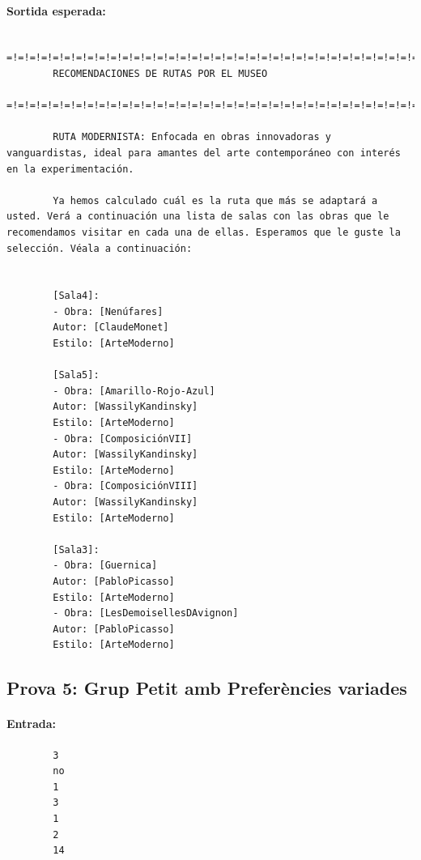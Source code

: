 \documentclass[a4paper]{article}
\begin{document}
	\paragraph{Sortida esperada:}
	\begin{verbatim}
		 =!=!=!=!=!=!=!=!=!=!=!=!=!=!=!=!=!=!=!=!=!=!=!=!=!=!=!=!=!=!=!=!=!=!=!= 
		RECOMENDACIONES DE RUTAS POR EL MUSEO                     
		=!=!=!=!=!=!=!=!=!=!=!=!=!=!=!=!=!=!=!=!=!=!=!=!=!=!=!=!=!=!=!=!=!=!=!= 
		
		RUTA MODERNISTA: Enfocada en obras innovadoras y vanguardistas, ideal para amantes del arte contemporáneo con interés en la experimentación.
		
		Ya hemos calculado cuál es la ruta que más se adaptará a usted. Verá a continuación una lista de salas con las obras que le recomendamos visitar en cada una de ellas. Esperamos que le guste la selección. Véala a continuación:
		
		
		[Sala4]:
		- Obra: [Nenúfares]
		Autor: [ClaudeMonet]
		Estilo: [ArteModerno]
		
		[Sala5]:
		- Obra: [Amarillo-Rojo-Azul]
		Autor: [WassilyKandinsky]
		Estilo: [ArteModerno]
		- Obra: [ComposiciónVII]
		Autor: [WassilyKandinsky]
		Estilo: [ArteModerno]
		- Obra: [ComposiciónVIII]
		Autor: [WassilyKandinsky]
		Estilo: [ArteModerno]
		
		[Sala3]:
		- Obra: [Guernica]
		Autor: [PabloPicasso]
		Estilo: [ArteModerno]
		- Obra: [LesDemoisellesDAvignon]
		Autor: [PabloPicasso]
		Estilo: [ArteModerno]
	\end{verbatim}
	
	
	\subsection{Prova 5: Grup Petit amb Preferències variades}
	\paragraph{Entrada:}
	\begin{verbatim}
		3
		no
		1
		3
		1
		2
		14
	\end{verbatim}
\end{document}
